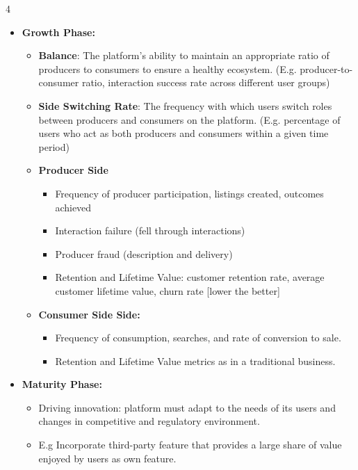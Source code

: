 \documentclass[10pt, landscape]{article}
\begin{document}
\begin{multicols*}{4}
\begin{itemize}
      \item \textbf{Growth Phase:}
      \begin{itemize}
        \item \textbf{Balance}: The platform's ability to maintain an appropriate ratio of producers to consumers to ensure a healthy ecosystem. (E.g. producer-to-consumer ratio, interaction success rate across different user groups)
        \item \textbf{Side Switching Rate}: The frequency with which users switch roles between producers and consumers on the platform. (E.g. percentage of users who act as both producers and consumers within a given time period)
        \item \textbf{Producer Side}
        \begin{itemize}
          \item Frequency of producer participation, listings created, outcomes achieved
          \item Interaction failure (fell through interactions)
          \item Producer fraud (description and delivery)
          \item Retention and Lifetime Value: customer retention rate, average customer lifetime value, churn rate [lower the better]
        \end{itemize}
        \item \textbf{Consumer Side Side:}
          \begin{itemize}
            \item Frequency of consumption, searches, and rate of conversion to sale.
            \item Retention and Lifetime Value metrics as in a traditional business.
          \end{itemize}
      \end{itemize}

      \item \textbf{Maturity Phase:}
        \begin{itemize}
          \item Driving innovation: platform must adapt to the needs of its users and changes in competitive and regulatory environment.
          \item E.g Incorporate third-party feature that provides a large share of value enjoyed by users as own feature.
        \end{itemize}
    \end{itemize}



\end{multicols*}
\end{document}
